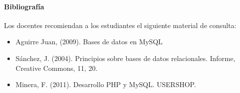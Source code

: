 \paragraph{Bibliografía} Los docentes recomiendan a los estudiantes el siguiente material de consulta:

\begin{itemize}
    \item Aguirre Juan, (2009). Bases de datos en MySQL 
    \item Sánchez, J. (2004). Principios sobre bases de datos relacionales. Informe, Creative Commons, 11, 20.
    \item Minera, F. (2011). Desarrollo PHP y MySQL. USERSHOP.
\end{itemize}